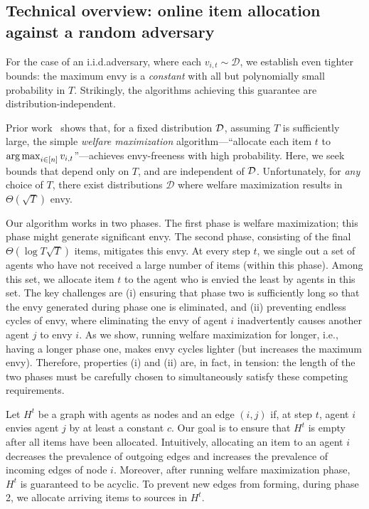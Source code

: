 \subsection{Technical overview: online item allocation against a random adversary}\label{subsec: why random is hard}

For the case of an i.i.d.\@ adversary, where each $v_{i,t} \sim \mathcal{D}$, we establish even tighter bounds: the maximum envy is a \emph{constant} with all but polynomially small probability in $T$. Strikingly, the algorithms achieving this guarantee are distribution-independent.

Prior work~\cite{dickerson2014computational} shows that, for a fixed distribution $\mathcal{D}$, assuming $T$ is sufficiently large, the simple \emph{welfare maximization} algorithm---``allocate each item $t$ to $\operatorname*{arg\,max}_{i \in [n]} v_{i,t}$''---achieves envy-freeness with high probability. Here, we seek bounds that depend only on $T$, and are independent of $\mathcal{D}$. Unfortunately, for \emph{any} choice of $T$, there exist distributions $\mathcal{D}$ where welfare maximization results in $\Theta(\sqrt{T})$ envy.

Our algorithm works in two phases. The first phase is welfare maximization; this phase might generate significant envy. The second phase, consisting of the final $\Theta(\log T \sqrt{T})$ items, mitigates this envy. At every step $t$, we single out a set of agents who have not received a large
number of items (within this phase). Among this set, we allocate item $t$ to the agent who is envied the least by agents in this set. The key challenges are (i) ensuring that phase two is sufficiently long so that the envy generated during phase one is eliminated, and (ii) preventing endless cycles of envy, where eliminating the envy of agent $i$ inadvertently causes another agent $j$ to envy $i$. As we show, running welfare maximization for longer, i.e., having a longer phase one, makes envy cycles lighter (but increases the maximum envy). Therefore, properties (i) and (ii) are, in fact, in tension: the length of the two phases must be carefully chosen to simultaneously satisfy these competing requirements.

Let $H^t$ be a graph with agents as nodes and an edge $(i,j)$ if, at step $t$, agent $i$ envies agent $j$ by at least a constant $c$. Our goal is to ensure that $H^t$ is empty after all items have been allocated. Intuitively, allocating an item to an agent $i$ decreases the prevalence of outgoing edges and increases the prevalence of incoming edges of node $i$. Moreover, after running welfare maximization phase, $H^t$ is guaranteed to be acyclic. To prevent new edges from forming, during phase 2, we allocate arriving items to sources in $H^t$.

